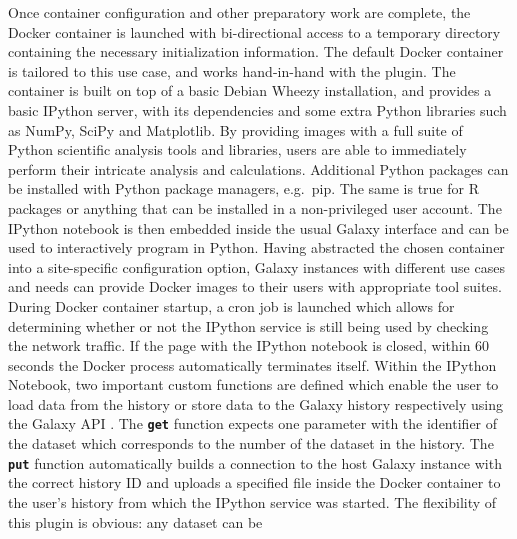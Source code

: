 \documentclass{bioinfo}
\begin{document}
\begin{methods}
Once container configuration and other preparatory work are complete, the Docker container is launched with bi-directional
access to a temporary directory containing the necessary initialization information. The default Docker container is
tailored to this use case, and works hand-in-hand with the plugin. The container is built on top of a basic Debian Wheezy installation,
and provides a basic IPython server, with its dependencies and some extra Python libraries such as NumPy, SciPy and Matplotlib.
By providing images with a full suite of Python scientific analysis tools and libraries, users are able 
to immediately perform their intricate analysis and calculations. Additional Python packages can be installed with Python
package managers, e.g.\ pip. The same is true for R packages or anything that can be installed in a non-privileged user account. 
The IPython notebook is then embedded inside the usual Galaxy interface and can be used to interactively program in Python.
Having abstracted the chosen container into a site-specific configuration option, Galaxy instances with different use cases
and needs can provide Docker images to their users with appropriate tool suites.\\
During Docker container startup, a cron job is launched which allows for determining whether or not the IPython service
is still being used by checking the network traffic. If the page with the IPython notebook is closed, within 60 seconds the
Docker process automatically terminates itself. Within the IPython Notebook, two important custom functions are defined which enable the
user to load data from the history or store data to the Galaxy history respectively using the Galaxy API \citep{Sloggett2013}.
The \textbf{\texttt{get}} function expects one parameter with the identifier of the dataset which corresponds to the number
of the dataset in the history. The \textbf{\texttt{put}} function automatically builds a connection to the host
Galaxy instance with the correct history ID and uploads a specified file inside the Docker container to the user's
history from which the IPython service was started. The flexibility of this plugin is obvious: any dataset can be

\end{methods}
\end{document}
